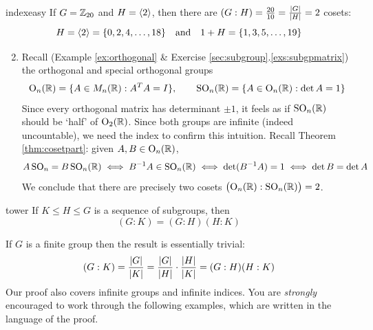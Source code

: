 \begin{examples}{}{indexeasy}
	\exstart If $G=\mathbb{Z}_{20}$ and $H=\left\langle 2\right\rangle$, then there are $(G:H)=\frac{20}{10}=\frac{\left| G\right|}{\left| H\right|}=2$ cosets:
	\[
		H=\left\langle 2\right\rangle=\{0,2,4,\ldots,18\}
		\quad\text{and}\quad 
		1+H=\{1,3,5,\ldots,19\}
		\]
	\begin{enumerate}\setcounter{enumi}{1}
	  \item\label{ex:indexeasy2} Recall (Example \ref{ex:orthogonal} \& Exercise \ref*{sec:subgroup}.\ref{exs:subgpmatrix}) the orthogonal and special orthogonal groups
	  \[
	  	\mathrm{O}_n(\mathbb{R})=\{A\in M_n(\mathbb{R}):A^TA=I\},\qquad
	  	\mathrm{SO}_n(\mathbb{R})=\{A\in\mathrm{O}_n(\mathbb{R}):\det A=1\}
	  \]
	  Since every orthogonal matrix has determinant $\pm 1$, it feels as if $\mathrm{SO}_n(\mathbb{R})$ should be `half' of $\mathrm{O}_2(\mathbb{R})$. Since both groups are infinite (indeed uncountable), we need the index to confirm this intuition. Recall Theorem \ref{thm:cosetpart}: given $A,B\in\mathrm{O}_n(\mathbb{R})$,
	  \[
	  	A\,\mathrm{SO}_n=B\,\mathrm{SO}_n(\mathbb{R})
	  	\iff B^{-1}A\in\mathrm{SO}_n(\mathbb{R})
	  	\iff \det(B^{-1}A)=1
	  	\iff \det B=\det A
	  \]
	  We conclude that there are precisely two cosets $\bigl(\mathrm{O}_n(\mathbb{R}):\mathrm{SO}_n(\mathbb{R})\bigr)=2$.
	\end{enumerate}
\end{examples}


\begin{thm}{}{tower}
	If $K\le H\le G$ is a sequence of subgroups, then
	\[
		(G:K)=(G:H)(H:K)
	\]
\end{thm}

If $G$ is a finite group then the result is essentially trivial:
\[
	(G:K)=\frac{\left| G\right|}{\left| K\right|}
	=\frac{\left| G\right|}{\left| H\right|}\cdot\frac{\left| H\right|}{\left| K\right|}
	=(G:H)(H:K)
\]
Our proof also covers infinite groups and infinite indices. You are \emph{strongly} encouraged to work through the following examples, which are written in the language of the proof.



